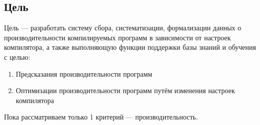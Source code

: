 \subsection{Цель}
Цель — разработать систему сбора, систематизации, формализации данных о производительности компилируемых программ в зависимости от настроек компилятора, а также выполняющую функции поддержки базы знаний и обучения с целью:
\begin{enumerate}
\item Предсказания производительности программ
\item Оптимизации производительности программ путём изменения настроек компилятора
\end{enumerate}

Пока рассматриваем только 1 критерий --- производительность.
